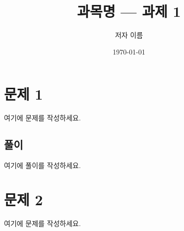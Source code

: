 \documentclass[11pt]{article}
\title{과목명 — 과제 1}
\author{저자 이름}
\date{\today}
\begin{document}
\maketitle

\section*{문제 1}
여기에 문제를 작성하세요.

\subsection*{풀이}
여기에 풀이를 작성하세요.

\section*{문제 2}
여기에 문제를 작성하세요.
\end{document}
